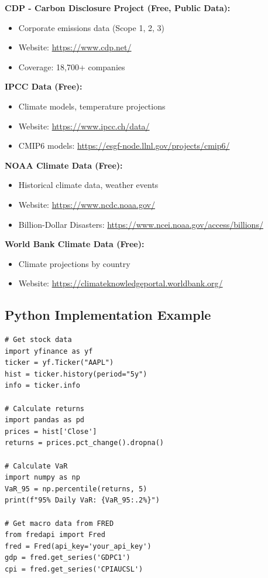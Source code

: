 \documentclass[11pt,a4paper]{article}
\begin{document}
\textbf{CDP - Carbon Disclosure Project (Free, Public Data):}
\begin{itemize}
    \item Corporate emissions data (Scope 1, 2, 3)
    \item Website: \url{https://www.cdp.net/}
    \item Coverage: 18,700+ companies
\end{itemize}

\textbf{IPCC Data (Free):}
\begin{itemize}
    \item Climate models, temperature projections
    \item Website: \url{https://www.ipcc.ch/data/}
    \item CMIP6 models: \url{https://esgf-node.llnl.gov/projects/cmip6/}
\end{itemize}

\textbf{NOAA Climate Data (Free):}
\begin{itemize}
    \item Historical climate data, weather events
    \item Website: \url{https://www.ncdc.noaa.gov/}
    \item Billion-Dollar Disasters: \url{https://www.ncei.noaa.gov/access/billions/}
\end{itemize}

\textbf{World Bank Climate Data (Free):}
\begin{itemize}
    \item Climate projections by country
    \item Website: \url{https://climateknowledgeportal.worldbank.org/}
\end{itemize}

\subsection{Python Implementation Example}

\begin{verbatim}
# Get stock data
import yfinance as yf
ticker = yf.Ticker("AAPL")
hist = ticker.history(period="5y")
info = ticker.info

# Calculate returns
import pandas as pd
prices = hist['Close']
returns = prices.pct_change().dropna()

# Calculate VaR
import numpy as np
VaR_95 = np.percentile(returns, 5)
print(f"95% Daily VaR: {VaR_95:.2%}")

# Get macro data from FRED
from fredapi import Fred
fred = Fred(api_key='your_api_key')
gdp = fred.get_series('GDPC1')
cpi = fred.get_series('CPIAUCSL')
\end{verbatim}
\end{document}
